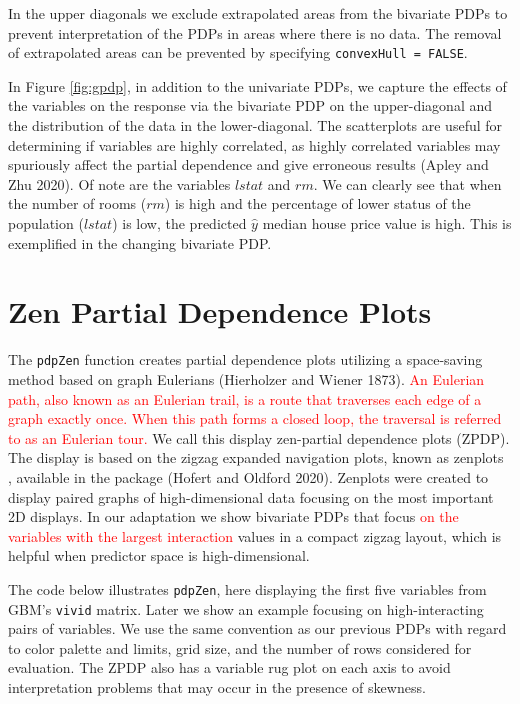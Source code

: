 In the upper diagonals we exclude extrapolated areas from the bivariate PDPs to prevent interpretation of the PDPs in areas where there is no data. The removal of extrapolated areas can be prevented by specifying \texttt{convexHull\ =\ FALSE}.

In Figure \ref{fig:gpdp}, in addition to the univariate PDPs, we capture the effects of the variables on the response via the bivariate PDP on the upper-diagonal and the distribution of the data in the lower-diagonal. The scatterplots are useful for determining if variables are highly correlated, as highly correlated variables may spuriously affect the partial dependence and give erroneous results (Apley and Zhu 2020). Of note are the variables \(lstat\) and \(rm\). We can clearly see that when the number of rooms (\(rm\)) is high and the percentage of lower status of the population (\(lstat\)) is low, the predicted \(\hat{y}\) median house price value is high. This is exemplified in the changing bivariate PDP.

\hypertarget{sec:ZPDP}{%
\section{Zen Partial Dependence Plots}\label{sec:ZPDP}}

The \texttt{pdpZen} function creates partial dependence plots utilizing a space-saving method based on graph Eulerians (Hierholzer and Wiener 1873). \textcolor{red}{An Eulerian path, also known as an Eulerian trail, is a route that traverses each edge of a graph exactly once. When this path forms a closed loop, the traversal is referred to as an Eulerian tour.} We call this display zen-partial dependence plots (ZPDP). The display is based on the zigzag expanded navigation plots, known as zenplots , available in the  package (Hofert and Oldford 2020). Zenplots were created to display paired graphs of high-dimensional data focusing on the most important 2D displays.
In our adaptation we show bivariate PDPs that focus \textcolor{red}{on the variables with the largest interaction} values in a compact zigzag layout, which is helpful when predictor space is high-dimensional.

The code below illustrates \texttt{pdpZen}, here displaying the first five variables from GBM's \texttt{vivid} matrix. Later we show an example focusing on high-interacting pairs of variables.
We use the same convention as our previous PDPs with regard to color palette and limits, grid size, and the number of rows considered for evaluation. The ZPDP also has a variable rug plot on each axis to avoid interpretation problems that may occur in the presence of skewness.

